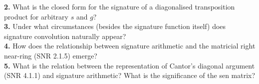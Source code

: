 \documentclass{article}
\begin{document}
\noindent \textbf{2.} What is the closed form for the signature of a diagonalised transposition product for arbitrary $s$ and $g$?\\

\noindent \textbf{3.} Under what circumstances (besides the signature function itself) does signature convolution naturally appear?\\

\noindent \textbf{4.} How does the relationship between signature arithmetic and the matricial right near-ring (SNR 2.1.5) emerge?\\

\noindent \textbf{5.} What is the relation between the representation of Cantor's diagonal argument (SNR 4.1.1) and signature arithmetic? What is the significance of the sen matrix?\\
\end{document}
